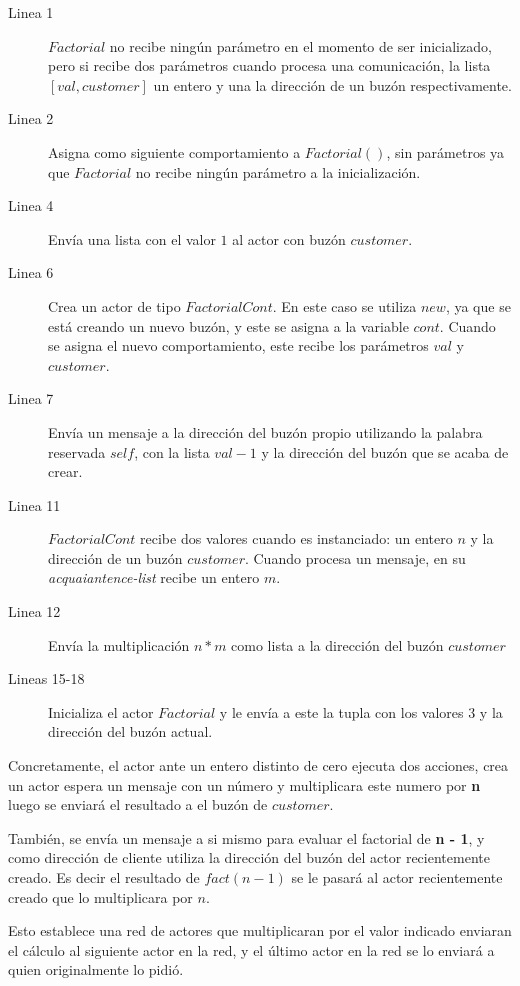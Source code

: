\begin{description}

\item [Linea 1] $Factorial$ no recibe ningún parámetro en el momento de ser inicializado, pero si recibe dos parámetros cuando procesa una comunicación, la lista $[val, customer]$ un entero y una la dirección de un buzón respectivamente.
\item [Linea 2] Asigna como siguiente comportamiento a $Factorial()$, sin parámetros ya que $Factorial$ no recibe ningún parámetro a la inicialización.  
\item [Linea 4] Envía una lista con el valor $1$ al actor con buzón $customer$.
\item [Linea 6] Crea un actor de tipo $FactorialCont$. En este caso se utiliza $new$, ya que se está creando un nuevo buzón, y este se asigna a la variable $cont$. Cuando se asigna el nuevo comportamiento, este recibe los parámetros $val$ y $customer$.
\item [Linea 7] Envía un mensaje a la dirección del buzón propio utilizando la palabra reservada $self$, con la lista $val - 1$ y la dirección del buzón que se acaba de crear.
\item [Linea 11] $FactorialCont$ recibe dos valores cuando es instanciado: un entero $n$ y la dirección de un buzón $customer$. Cuando procesa un mensaje, en su \textit{acquaiantence-list} recibe un entero $m$.
\item [Linea 12] Envía la multiplicación $n*m$ como lista a la dirección del buzón $customer$ 
\item [Lineas 15-18] Inicializa el actor $Factorial$ y le envía a este la tupla con los valores $3$ y la dirección del buzón actual. 

\end{description}

Concretamente, el actor ante un entero distinto de cero ejecuta dos acciones, crea un actor espera un mensaje con un número y multiplicara este numero por \textbf{n} luego se enviará el resultado a el buzón de $customer$.

También, se envía un mensaje a si mismo para evaluar el factorial de \textbf{n - 1}, y como dirección de cliente utiliza la dirección del buzón del actor recientemente creado. Es decir el resultado de $fact(n - 1)$ se le pasará al actor recientemente creado que lo multiplicara por $n$.

Esto establece una red de actores que multiplicaran por  el valor indicado enviaran el cálculo al siguiente actor en la red, y el último actor  en la red se lo enviará a quien originalmente lo pidió. 

